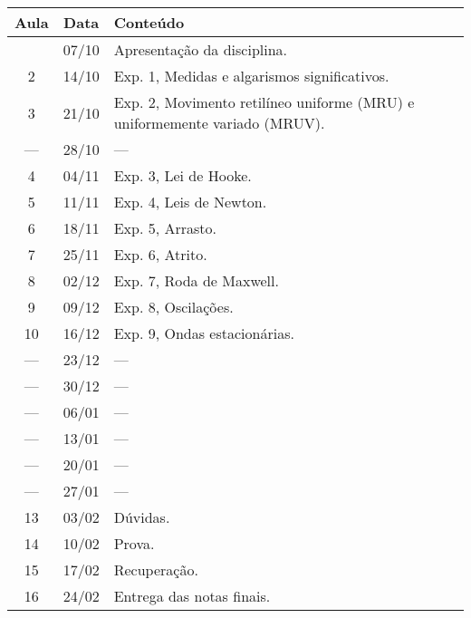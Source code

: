 \begin{center}
\begin{longtable}{ccp{70mm}}
\toprule
Aula & Data & Conteúdo \\
\midrule
\endhead
\bottomrule
\endfoot
  1 & 07/10 & Apresentação da disciplina. \\
  2 & 14/10 & Exp. 1, Medidas e algarismos significativos. \\
  3 & 21/10 & Exp. 2, Movimento retilíneo uniforme (MRU) e uniformemente variado (MRUV). \\
--- & 28/10 & --- \\
  4 & 04/11 & Exp. 3, Lei de Hooke. \\
  5 & 11/11 & Exp. 4, Leis de Newton. \\
  6 & 18/11 & Exp. 5, Arrasto. \\
  7 & 25/11 & Exp. 6, Atrito. \\
  8 & 02/12 & Exp. 7, Roda de Maxwell. \\
  9 & 09/12 & Exp. 8, Oscilações. \\
 10 & 16/12 & Exp. 9, Ondas estacionárias. \\
--- & 23/12 & --- \\
--- & 30/12 & --- \\
--- & 06/01 & --- \\
--- & 13/01 & --- \\
--- & 20/01 & --- \\ 
--- & 27/01 & --- \\
 13 & 03/02 & Dúvidas. \\
 14 & 10/02 & Prova.\\
 15 & 17/02 & Recuperação.\\
 16 & 24/02 & Entrega das notas finais.
\end{longtable}
\end{center}

\clearpage


